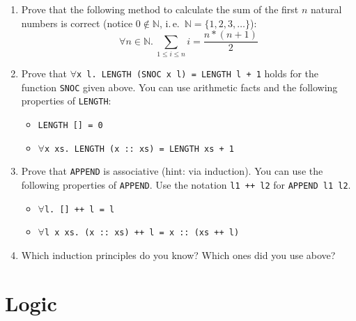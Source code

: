 \documentclass[a4paper,10pt,oneside]{scrartcl}
\begin{document}
\begin{enumerate}
\item Prove that the following method to calculate the sum of the first $n$ natural numbers is correct (notice $0 \notin \mathbb{N}$, i.\,e.\ $\mathbb{N} = \{1, 2, 3, \ldots\}$):
    \[\forall n \in \mathbb{N}.\ \sum_{1 \leq i \leq n} i = \frac{n * (n+1)}{2}\]
\item Prove that \texttt{$\forall$x l.\ LENGTH (SNOC x l) = LENGTH l + 1} holds for the function \texttt{SNOC} given above. You can use arithmetic facts and the
   following properties of \texttt{LENGTH}:
\begin{itemize}
\item \texttt{LENGTH [] = 0}
\item \texttt{$\forall$x xs.\ LENGTH (x ::\ xs) = LENGTH xs + 1}
\end{itemize}

\item Prove that \texttt{APPEND} is associative (hint: via induction). You can use the following
      properties of \texttt{APPEND}. Use the notation \texttt{l1 ++ l2} for \texttt{APPEND l1 l2}.

\begin{itemize}
\item \texttt{$\forall$l.\ [] ++ l = l}
\item \texttt{$\forall$l x xs.\ (x ::\ xs) ++ l = x ::\ (xs ++ l)}
\end{itemize}

\item Which induction principles do you know? Which ones did you use above?

\end{enumerate}


\section{Logic}
\end{document}
